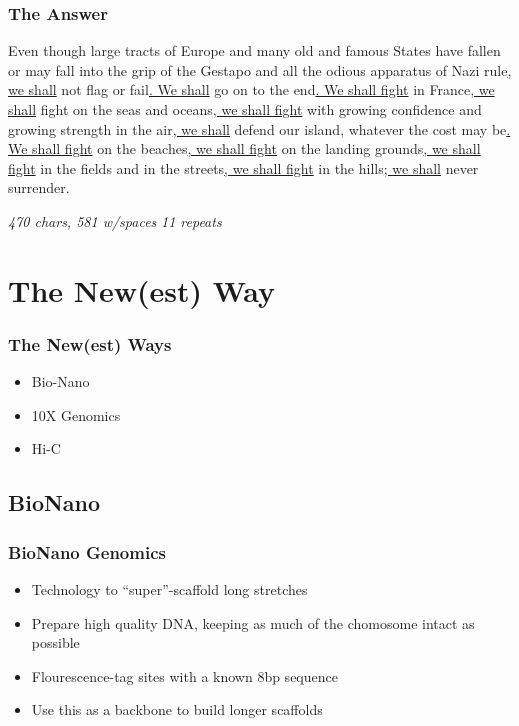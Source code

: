 \documentclass[14pt,handout]{beamer}
\begin{document}
\begin{frame}
\frametitle{The Answer}
\ttfamily
\small
Even though large tracts of Europe and many old and famous States have fallen or may fall into the grip of the Gestapo and all the odious apparatus of Nazi rule\underline{, we shall} not flag or fail\underline{. We shall} go on to the end\underline{. We shall fight} in France\underline{, we shall} fight on the seas and oceans\underline{, we shall fight} with growing confidence and growing strength in the air\underline{, we shall} defend our island, whatever the cost may be\underline{. We shall fight} on the beaches\underline{, we shall fight} on the landing grounds\underline{, we shall fight} in the fields and in the streets\underline{, we shall fight} in the hills\underline{; we shall} never surrender.

\textit{470 chars, 581 w/spaces}
\textit{11 repeats}
\end{frame}


\section{The New(est) Way}

\begin{frame}
\frametitle{The New(est) Ways}
\begin{itemize}
	\item<+-> Bio-Nano
	\item<+-> 10X Genomics
	\item<+-> Hi-C 
\end{itemize}
\end{frame}

\subsection{BioNano}

\begin{frame}
\frametitle{BioNano Genomics}
\begin{itemize}
	\item<+-> Technology to ``super''-scaffold long stretches
	\item<+-> Prepare high quality DNA, keeping as much of the chomosome intact as possible
	\item<+-> Flourescence-tag sites with a known 8bp sequence
	\item<+-> Use this as a backbone to build longer scaffolds
\end{itemize}
\end{frame}
\end{document}

